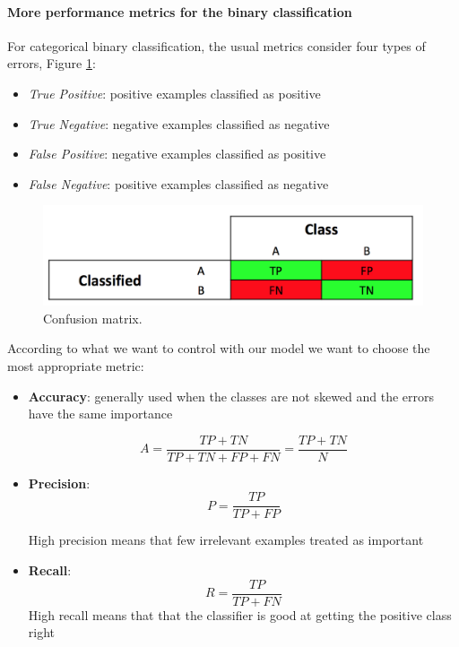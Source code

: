 \paragraph{More performance metrics for the binary classification}
\label{sec:perf}

For categorical binary classification, the usual metrics consider four types of errors, Figure \ref{pic:confusion_matrix}:

\begin{itemize}
\item \emph{True Positive}: positive examples classified as positive
\item \emph{True Negative}: negative examples classified as negative
\item \emph{False Positive}: negative examples classified as positive
\item \emph{False Negative}: positive examples classified as negative
\end{itemize}

\begin{figure}[H]%
 \centering
 \includegraphics[width=13cm]{./img/08/confusion_matrix}
 \caption{\label{pic:confusion_matrix} Confusion matrix.}
\end{figure}

According to what we want to control with our model we want to choose the most appropriate metric:
\begin{itemize}
\item \textbf{Accuracy}: generally used when the classes are not skewed
and the errors have the same importance

$$A = \frac{TP+TN}{TP+TN+FP+FN} =  \frac{TP+TN}{N}$$

\item \textbf{Precision}: 
$$P = \frac{TP}{TP+FP}$$

High precision means that few irrelevant examples treated as important 
\item \textbf{Recall}: 
$$	R = \frac{TP}{TP+FN}$$
High recall means that that the classifier is good at getting the positive class right
\end{itemize}

